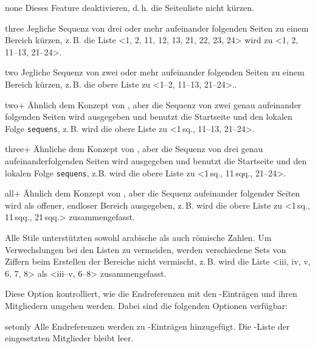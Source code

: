 \documentclass{ltxdockit}[2011/03/25]
\begin{document}
\begin{optionlist}
\begin{valuelist}
\item[none] Dieses Feature deaktivieren, d.\,h. die Seitenliste nicht kürzen.

\item[three] Jegliche Sequenz von drei oder mehr aufeinander folgenden Seiten zu
einem Bereich kürzen, z.\,B. die Liste <1, 2, 11, 12, 13, 21, 22, 23, 24> wird
zu <1, 2, 11--13, 21--24>.

\item[two] Jegliche Sequenz von zwei oder mehr aufeinander folgenden Seiten zu
einem Bereich kürzen, z.\,B. die obere Liste zu <1--2, 11--13, 21--24>..

\item[two+] Ähnlich dem Konzept von , aber die Sequenz von zwei genau
aufeinander folgenden Seiten wird ausgegeben und benutzt die Startseite und den
lokalen Folge \texttt{sequens}, z.\,B. wird die obere Liste zu <1\,sq., 11--13,
21--24>.

\item[three+] Ähnliche dem Konzept von , aber die Sequenz von drei
genau aufeinanderfolgenden Seiten wird ausgegeben und benutzt die Startseite und
den lokalen Folge \texttt{sequens}, z.B. wird die obere Liste zu <1\,sq.,
11\,sqq., 21--24>.

\item[all+] Ähnlich dem Konzept von , aber die Sequenz aufeinander
folgender Seiten wird als offener, endloser Bereich ausgegeben, z.\,B. wird die
obere Liste zu <1\,sq., 11\,sqq., 21\,sqq.> zusammengefasst.

\end{valuelist} 

Alle Stile unterstützten sowohl arabische als auch römische Zahlen. Um
Verwechslungen bei den Listen zu vermeiden, werden verschiedene Sets von Ziffern
beim Erstellen der Bereiche nicht vermischt, z.\,B. wird die Liste <iii, iv, v,
6, 7, 8> als <iii--v, 6--8> zusammengefasst.


Diese Option kontrolliert, wie die Endreferenzen mit den -Einträgen
und ihren Mitgliedern umgehen werden. Dabei sind die folgenden Optionen
verfügbar:

\begin{valuelist}

\item[setonly] Alle Endreferenzen werden zu -Einträgen hinzugefügt.
Die -Liste der eingesetzten Mitglieder bleibt leer.


\end{valuelist}
\end{optionlist}
\end{document}
